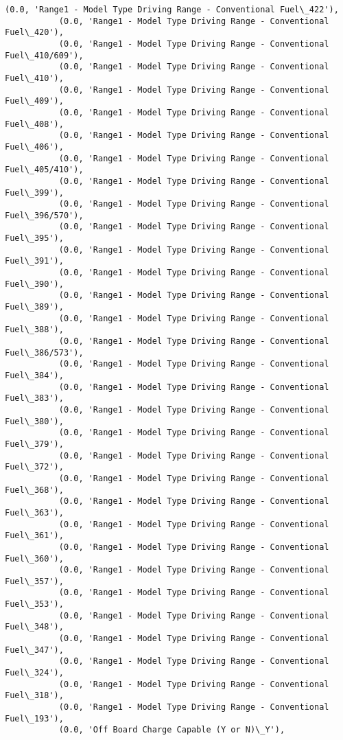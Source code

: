 \documentclass[11pt]{article}
\begin{document}
\begin{Verbatim}[commandchars=\\\{\}]
           (0.0, 'Range1 - Model Type Driving Range - Conventional Fuel\_422'),
           (0.0, 'Range1 - Model Type Driving Range - Conventional Fuel\_420'),
           (0.0, 'Range1 - Model Type Driving Range - Conventional Fuel\_410/609'),
           (0.0, 'Range1 - Model Type Driving Range - Conventional Fuel\_410'),
           (0.0, 'Range1 - Model Type Driving Range - Conventional Fuel\_409'),
           (0.0, 'Range1 - Model Type Driving Range - Conventional Fuel\_408'),
           (0.0, 'Range1 - Model Type Driving Range - Conventional Fuel\_406'),
           (0.0, 'Range1 - Model Type Driving Range - Conventional Fuel\_405/410'),
           (0.0, 'Range1 - Model Type Driving Range - Conventional Fuel\_399'),
           (0.0, 'Range1 - Model Type Driving Range - Conventional Fuel\_396/570'),
           (0.0, 'Range1 - Model Type Driving Range - Conventional Fuel\_395'),
           (0.0, 'Range1 - Model Type Driving Range - Conventional Fuel\_391'),
           (0.0, 'Range1 - Model Type Driving Range - Conventional Fuel\_390'),
           (0.0, 'Range1 - Model Type Driving Range - Conventional Fuel\_389'),
           (0.0, 'Range1 - Model Type Driving Range - Conventional Fuel\_388'),
           (0.0, 'Range1 - Model Type Driving Range - Conventional Fuel\_386/573'),
           (0.0, 'Range1 - Model Type Driving Range - Conventional Fuel\_384'),
           (0.0, 'Range1 - Model Type Driving Range - Conventional Fuel\_383'),
           (0.0, 'Range1 - Model Type Driving Range - Conventional Fuel\_380'),
           (0.0, 'Range1 - Model Type Driving Range - Conventional Fuel\_379'),
           (0.0, 'Range1 - Model Type Driving Range - Conventional Fuel\_372'),
           (0.0, 'Range1 - Model Type Driving Range - Conventional Fuel\_368'),
           (0.0, 'Range1 - Model Type Driving Range - Conventional Fuel\_363'),
           (0.0, 'Range1 - Model Type Driving Range - Conventional Fuel\_361'),
           (0.0, 'Range1 - Model Type Driving Range - Conventional Fuel\_360'),
           (0.0, 'Range1 - Model Type Driving Range - Conventional Fuel\_357'),
           (0.0, 'Range1 - Model Type Driving Range - Conventional Fuel\_353'),
           (0.0, 'Range1 - Model Type Driving Range - Conventional Fuel\_348'),
           (0.0, 'Range1 - Model Type Driving Range - Conventional Fuel\_347'),
           (0.0, 'Range1 - Model Type Driving Range - Conventional Fuel\_324'),
           (0.0, 'Range1 - Model Type Driving Range - Conventional Fuel\_318'),
           (0.0, 'Range1 - Model Type Driving Range - Conventional Fuel\_193'),
           (0.0, 'Off Board Charge Capable (Y or N)\_Y'),

\end{Verbatim}
\end{document}
